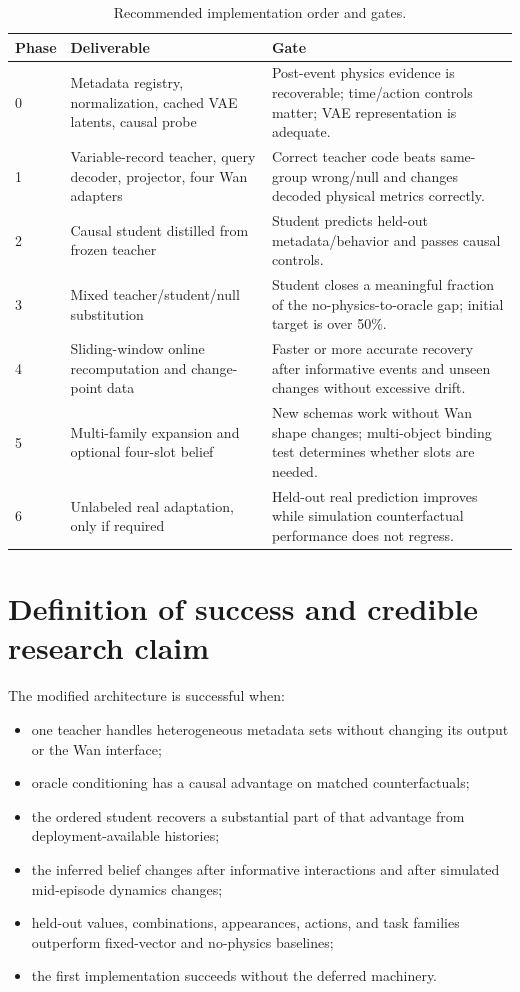 \documentclass[11pt]{article}
\begin{document}
\begin{table}[H]
\centering
\small
\caption{Recommended implementation order and gates.}
\begin{tabularx}{\textwidth}{C{0.07\textwidth} L{0.32\textwidth} Y}
\toprule
Phase & Deliverable & Gate \\
 & Metadata registry, normalization, cached VAE latents, causal probe & Post-event physics evidence is recoverable; time/action controls matter; VAE representation is adequate. \\
1 & Variable-record teacher, query decoder, projector, four Wan adapters & Correct teacher code beats same-group wrong/null and changes decoded physical metrics correctly. \\
2 & Causal student distilled from frozen teacher & Student predicts held-out metadata/behavior and passes causal controls. \\
3 & Mixed teacher/student/null substitution & Student closes a meaningful fraction of the no-physics-to-oracle gap; initial target is over 50\%. \\
4 & Sliding-window online recomputation and change-point data & Faster or more accurate recovery after informative events and unseen changes without excessive drift. \\
5 & Multi-family expansion and optional four-slot belief & New schemas work without Wan shape changes; multi-object binding test determines whether slots are needed. \\
6 & Unlabeled real adaptation, only if required & Held-out real prediction improves while simulation counterfactual performance does not regress. \\
\bottomrule
\end{tabularx}
\end{table}

\section{Definition of success and credible research claim}

The modified architecture is successful when:
\begin{itemize}
  \item one teacher handles heterogeneous metadata sets without changing its
  output or the Wan interface;
  \item oracle conditioning has a causal advantage on matched counterfactuals;
  \item the ordered student recovers a substantial part of that advantage from
  deployment-available histories;
  \item the inferred belief changes after informative interactions and after
  simulated mid-episode dynamics changes;
  \item held-out values, combinations, appearances, actions, and task families
  outperform fixed-vector and no-physics baselines;
  \item the first implementation succeeds without the deferred machinery.
\end{itemize}
\end{document}

